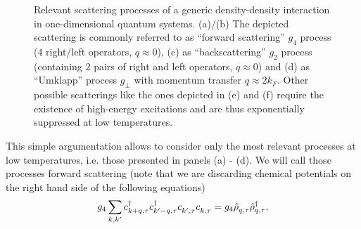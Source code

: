 \begin{figure}
    \caption{Relevant scattering processes of a generic density-density interaction in one-dimensional quantum systems. (a)/(b) The depicted scattering is commonly referred to as ``forward scattering'' $g_4$ process ($4$ right/left operators, $q\approx0$), (c) as ``backscattering'' $g_2$ process (containing $2$ pairs of right and left operators, $q\approx0$) and (d) as ``Umklapp'' process $g_\perp$ with momentum transfer $q\approx 2k_F$. Other possible scatterings like the ones depicted in (e) and (f) require the existence of high-energy excitations and are thus exponentially suppressed at low temperatures.}
    \label{fig:scattering_processes}
\end{figure}
This simple argumentation allows to consider only the most relevant processes at low temperatures, i.e. those presented in panels (a) - (d).
We will call those processes forward scattering (note that we are discarding chemical potentials on the right hand side of the following equations)
\begin{align}
    g_4\sum_{k,k'}c^\dag_{k+q,\tau}c^\dag_{k'-q,\tau}c^\pdag_{k',\tau}c^\pdag_{k,\tau} = g_4 \hat\rho^\pdag_{q,\tau}\hat\rho^\dag_{q,\tau},
\end{align}
